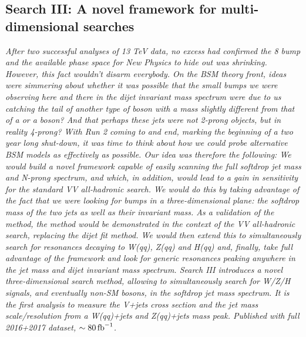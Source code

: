 \vspace*{\fill}
\begin{centering}
\section{Search III: A novel framework for multi-dimensional searches}
\label{searchIII}
\textit{
After two successful analyses of 13 TeV data, no excess had confirmed the 8 \TeV bump and the available phase space for New Physics to hide out was shrinking. However, this fact wouldn't disarm everybody. On the BSM theory front, ideas were simmering about whether it was possible that the small bumps we were observing here and there in the dijet invariant mass spectrum were due to us catching the tail of another type of boson with a mass slightly different from that of a \PW or a \PZ boson? And that perhaps these jets were not 2-prong objects, but in reality 4-prong? With Run 2 coming to and end, marking the beginning of a two year long shut-down, it was time to think about how we could probe alternative BSM models as effectively as possible. Our idea was therefore the following: We would build a novel framework capable of easily scanning the full softdrop jet mass and N-prong spectrum, and which, in addition, would lead to a gain in sensitivity for the standard VV all-hadronic search. We would do this by taking advantage of the fact that we were looking for bumps in a three-dimensional plane: the softdrop mass of the two jets as well as their invariant mass. As a validation of the method, the method would be demonstrated in the context of the VV all-hadronic search, replacing the dijet fit method. We would then extend this to simultaneously search for resonances decaying to W(qq), Z(qq) and H(qq) and, finally, take full advantage of the framework and look for generic resonances peaking anywhere in the jet mass and dijet invariant mass spectrum.
\newline
\newline
Search III introduces a novel three-dimensional search method, allowing to simultaneously search for W/Z/H signals, and eventually non-SM bosons, in the softdrop jet mass spectrum. It is the first analysis to measure the V+jets cross section and the jet mass scale/resolution from a W(qq)+jets and Z(qq)+jets mass peak. Published with full 2016+2017 dataset, $\sim 80 \mbox{\ensuremath{\,\text{fb}^\text{$-$1}}}$.}
\end{centering}
